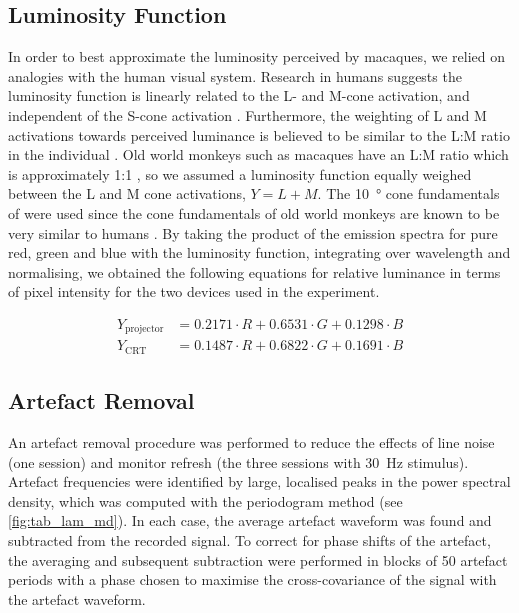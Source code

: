 \subsection{Luminosity Function}

In order to best approximate the luminosity perceived by macaques, we relied on analogies with the human visual system.
Research in humans suggests the luminosity function is linearly related to the L- and M-cone activation, and independent of the S-cone activation \citep{Stockman2008}.
Furthermore, the weighting of L and M activations towards perceived luminance is believed to be similar to the L:M ratio in the individual \citep{Stockman2008}.
Old world monkeys such as macaques have an L:M ratio which is approximately 1:1 \citep{Dobkins2000}, so we assumed a luminosity function equally weighed between the L and M cone activations, $Y=L+M$.
The \SI{10}{\degree} cone fundamentals of \citet{Stockman2000} were used since the cone fundamentals of old world monkeys are known to be very similar to humans \citep{Dobkins2000}.
By taking the product of the emission spectra for pure red, green and blue with the luminosity function, integrating over wavelength and normalising, we obtained the following equations for relative luminance in terms of pixel intensity for the two devices used in the experiment.

\begin{align*}
    Y_{\text{projector}} &= 0.2171 \cdot R + 0.6531 \cdot G + 0.1298 \cdot B\\
    Y_{\text{CRT}}       &= 0.1487 \cdot R + 0.6822 \cdot G + 0.1691 \cdot B
\end{align*}


\subsection{Artefact Removal}

An artefact removal procedure was performed to reduce the effects of line noise (one session) and monitor refresh (the three sessions with \SI{30}{Hz} stimulus).
Artefact frequencies were identified by large, localised peaks in the power spectral density, which was computed with the periodogram method (see \autoref{fig:tab_lam_md}).
In each case, the average artefact waveform was found and subtracted from the recorded signal.
To correct for phase shifts of the artefact, the averaging and subsequent subtraction were performed in blocks of 50 artefact periods with a phase chosen to maximise the cross-covariance of the signal with the artefact waveform.


